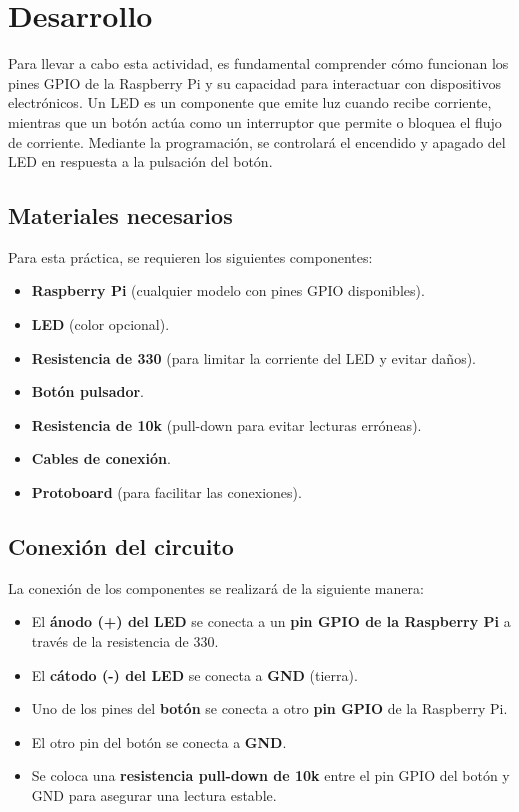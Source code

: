\section{Desarrollo}
Para llevar a cabo esta actividad, es fundamental comprender cómo funcionan los pines GPIO de la Raspberry Pi y su capacidad para interactuar con dispositivos electrónicos. Un LED es un componente que emite luz cuando recibe corriente, mientras que un botón actúa como un interruptor que permite o bloquea el flujo de corriente. Mediante la programación, se controlará el encendido y apagado del LED en respuesta a la pulsación del botón.

\subsection{Materiales necesarios}
Para esta práctica, se requieren los siguientes componentes:
\begin{itemize}
	\item \textbf{Raspberry Pi} (cualquier modelo con pines GPIO disponibles).
	\item \textbf{LED} (color opcional).
	\item \textbf{Resistencia de 330\textohm} (para limitar la corriente del LED y evitar daños).
	\item \textbf{Botón pulsador}.
	\item \textbf{Resistencia de 10k\textohm} (pull-down para evitar lecturas erróneas).
	\item \textbf{Cables de conexión}.
	\item \textbf{Protoboard} (para facilitar las conexiones).
\end{itemize}

\subsection{Conexión del circuito}
La conexión de los componentes se realizará de la siguiente manera:
\begin{itemize}
	\item El \textbf{ánodo (+) del LED} se conecta a un \textbf{pin GPIO de la Raspberry Pi} a través de la resistencia de 330\textohm.
	\item El \textbf{cátodo (-) del LED} se conecta a \textbf{GND} (tierra).
	\item Uno de los pines del \textbf{botón} se conecta a otro \textbf{pin GPIO} de la Raspberry Pi.
	\item El otro pin del botón se conecta a \textbf{GND}.
	\item Se coloca una \textbf{resistencia pull-down de 10k\textohm} entre el pin GPIO del botón y GND para asegurar una lectura estable.
\end{itemize}

